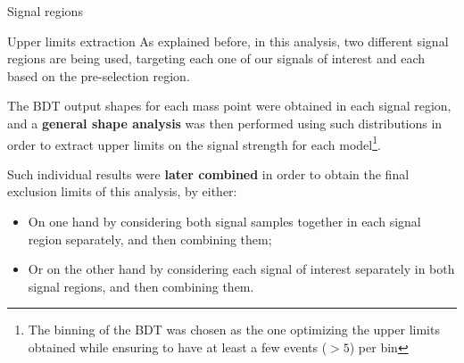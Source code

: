 \documentclass[8pt]{beamer}
\begin{document}
\begin{frame}[standout]
Signal regions
\end{frame}

\begin{frame}{Upper limits extraction}
\justifying
As explained before, in this analysis, \alert{two different signal regions} are being used, targeting each one of our signals of interest and each based on the pre-selection region. \vfill

The BDT output shapes for each mass point were obtained in each signal region, and a \textbf{general shape analysis} was then performed using such distributions in order to \alert{extract upper limits on the signal strength} for each model\footnote[frame]{The binning of the BDT was chosen as the one optimizing the upper limits obtained while ensuring to have at least a few events ($> 5$) per bin}. 

Such individual results were \textbf{later combined} in order to obtain the final exclusion limits of this analysis, by either:
\begin{itemize}
\justifying
\item On one hand by considering both signal samples together in each signal region separately, and then combining them;
\item Or on the other hand by considering each signal of interest separately in both signal regions, and then combining them.
\end{itemize} \vfill
\end{frame}
\end{document}
